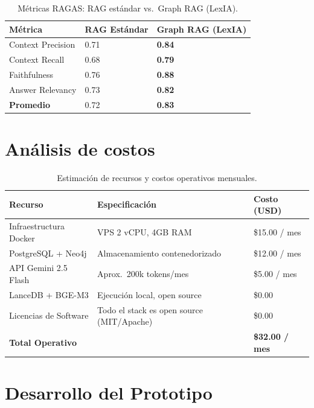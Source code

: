 \documentclass[12pt, letterpaper]{report}
\begin{document}
\begin{table}[H]
  \centering
  \renewcommand{\arraystretch}{1.3}
  \caption{M\'{e}tricas RAGAS: RAG est\'{a}ndar vs.\ Graph RAG (LexIA).}
  \label{tab:metricas_ragas}
  \begin{tabular}{|p{}|p{}|p{}|}
  \hline
  \textbf{M\'{e}trica} & \textbf{RAG Est\'{a}ndar} & \textbf{Graph RAG (LexIA)} \\ \hline
  Context Precision & 0.71 & \textbf{0.84} \\ \hline
  Context Recall & 0.68 & \textbf{0.79} \\ \hline
  Faithfulness & 0.76 & \textbf{0.88} \\ \hline
  Answer Relevancy & 0.73 & \textbf{0.82} \\ \hline
  \textbf{Promedio} & 0.72 & \textbf{0.83} \\ \hline
  \end{tabular}
\end{table}

\section{An\'{a}lisis de costos}

\begin{table}[H]
  \centering
  \renewcommand{\arraystretch}{1.3}
  \caption{Estimaci\'{o}n de recursos y costos operativos mensuales.}
  \label{tab:presupuesto}
  \begin{tabular}{|p{}|p{}|p{}|}
  \hline
  \textbf{Recurso} & \textbf{Especificaci\'{o}n} & \textbf{Costo (USD)} \\ \hline
  Infraestructura Docker & VPS 2 vCPU, 4GB RAM & \$15.00 / mes \\ \hline
  PostgreSQL + Neo4j & Almacenamiento contenedorizado & \$12.00 / mes \\ \hline
  API Gemini 2.5 Flash & Aprox.\ 200k tokens/mes & \$5.00 / mes \\ \hline
  LanceDB + BGE-M3 & Ejecuci\'{o}n local, open source & \$0.00 \\ \hline
  Licencias de Software & Todo el stack es open source (MIT/Apache) & \$0.00 \\ \hline
  \textbf{Total Operativo} & & \textbf{\$32.00 / mes} \\ \hline
  \end{tabular}
\end{table}

\section{Desarrollo del Prototipo}
\end{document}
